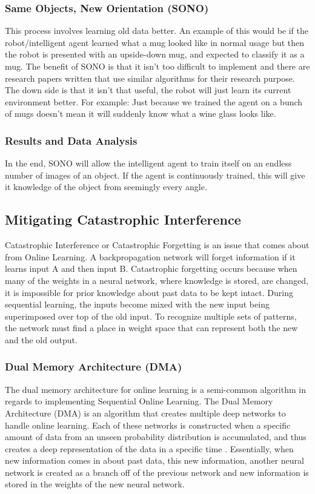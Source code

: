 \documentclass[draftclsnofoot, onecolumn, 10pt, compsoc]{IEEEtran}
\begin{document}
\subsubsection{Same Objects, New Orientation (SONO)}
This process involves learning old data better. An example of this would be if the robot/intelligent agent learned what a mug looked like in normal usage but then the robot is presented with an upside-down mug, and expected to classify it as a mug. The benefit of SONO is that it isn’t too difficult to implement and there are research papers written that use similar algorithms for their research purpose. The down side is that it isn’t that useful, the robot will just learn its current environment better. For example: Just because we trained the agent on a bunch of mugs doesn’t mean it will suddenly know what a wine glass looks like.

\subsubsection{Results and Data Analysis}
In the end, SONO will allow the intelligent agent to train itself on an endless number of images of an object. If the agent is continuously trained, this will give it knowledge of the object from seemingly every angle. 

\subsection{Mitigating Catastrophic Interference}
Catastrophic Interference or Catastrophic Forgetting is an issue that comes about from Online Learning. A backpropagation network will forget information if it learns input A and then input B. Catastrophic forgetting occurs because when many of the weights in a neural network, where knowledge is stored, are changed, it is impossible for prior knowledge about past data to be kept intact. During sequential learning, the inputs become mixed with the new input being superimposed over top of the old input. To recognize multiple sets of patterns, the network must find a place in weight space that can represent both the new and the old output. 

\subsubsection{Dual Memory Architecture (DMA)}
The dual memory architecture for online learning is a semi-common algorithm in regards to implementing Sequential Online Learning. The Dual Memory Architecture (DMA) is an algorithm that creates multiple deep networks to handle online learning. Each of these networks is constructed when a specific amount of data from an unseen probability distribution is accumulated, and thus creates a deep representation of the data in a specific time \cite{Lee}. Essentially, when new information comes in about past data, this new information, another neural network is created as a branch off of the previous network and new information is stored in the weights of the new neural network.
\end{document}
